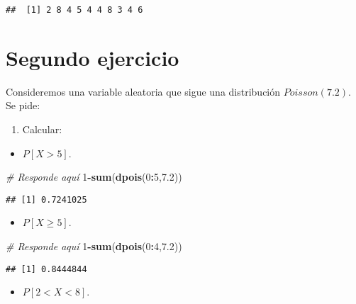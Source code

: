 \documentclass[
]{article}
\newenvironment{Shaded}{\begin{snugshade}}{\end{snugshade}}
\newcommand{\CommentTok}[1]{\textcolor[rgb]{0.56,0.35,0.01}{\textit{#1}}}
\newcommand{\DecValTok}[1]{\textcolor[rgb]{0.00,0.00,0.81}{#1}}
\newcommand{\FloatTok}[1]{\textcolor[rgb]{0.00,0.00,0.81}{#1}}
\newcommand{\KeywordTok}[1]{\textcolor[rgb]{0.13,0.29,0.53}{\textbf{#1}}}
\newcommand{\NormalTok}[1]{#1}
\newcommand{\OperatorTok}[1]{\textcolor[rgb]{0.81,0.36,0.00}{\textbf{#1}}}
\providecommand{\tightlist}{%
  \setlength{\itemsep}{0pt}\setlength{\parskip}{0pt}}
\begin{document}
\begin{verbatim}
##  [1] 2 8 4 5 4 4 8 3 4 6
\end{verbatim}

\hypertarget{segundo-ejercicio}{%
\section{Segundo ejercicio}\label{segundo-ejercicio}}

Consideremos una variable aleatoria que sigue una distribución
\(Poisson(7.2)\). Se pide:

\begin{enumerate}
\def\labelenumi{\arabic{enumi}.}
\tightlist
\item
  Calcular:
\end{enumerate}

\begin{itemize}
\tightlist
\item
  \(P[X > 5]\).
\end{itemize}

\begin{Shaded}
\begin{Highlighting}[]
\CommentTok{# Responde aquí}
\DecValTok{1}\OperatorTok{-}\KeywordTok{sum}\NormalTok{(}\KeywordTok{dpois}\NormalTok{(}\DecValTok{0}\OperatorTok{:}\DecValTok{5}\NormalTok{,}\FloatTok{7.2}\NormalTok{))}
\end{Highlighting}
\end{Shaded}

\begin{verbatim}
## [1] 0.7241025
\end{verbatim}

\begin{itemize}
\tightlist
\item
  \(P[X \geq 5]\).
\end{itemize}

\begin{Shaded}
\begin{Highlighting}[]
\CommentTok{# Responde aquí}
\DecValTok{1}\OperatorTok{-}\KeywordTok{sum}\NormalTok{(}\KeywordTok{dpois}\NormalTok{(}\DecValTok{0}\OperatorTok{:}\DecValTok{4}\NormalTok{,}\FloatTok{7.2}\NormalTok{))}
\end{Highlighting}
\end{Shaded}

\begin{verbatim}
## [1] 0.8444844
\end{verbatim}

\begin{itemize}
\tightlist
\item
  \(P[2 < X < 8]\).
\end{itemize}
\end{document}
